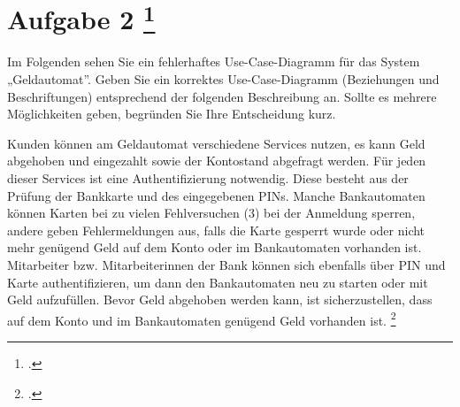 \documentclass{lehramt-informatik-aufgabe}
\begin{document}
\section{Aufgabe 2
\footcite[Thema 1 Teilaufgabe 1 Aufgabe 2]{examen:46116:2017:03}}

Im Folgenden sehen Sie ein fehlerhaftes Use-Case-Diagramm für das System
„Geldautomat”. Geben Sie ein korrektes Use-Case-Diagramm (Beziehungen
und Beschriftungen) entsprechend der folgenden Beschreibung an. Sollte
es mehrere Möglichkeiten geben, begründen Sie Ihre Entscheidung kurz.

Kunden können am Geldautomat verschiedene Services nutzen, es kann Geld
abgehoben und eingezahlt sowie der Kontostand abgefragt werden. Für
jeden dieser Services ist eine Authentifizierung notwendig. Diese
besteht aus der Prüfung der Bankkarte und des eingegebenen PINs. Manche
Bankautomaten können Karten bei zu vielen Fehlversuchen (3) bei der
Anmeldung sperren, andere geben Fehlermeldungen aus, falls die Karte
gesperrt wurde oder nicht mehr genügend Geld auf dem Konto oder im
Bankautomaten vorhanden ist. Mitarbeiter bzw. Mitarbeiterinnen der Bank
können sich ebenfalls über PIN und Karte authentifizieren, um dann den
Bankautomaten neu zu starten oder mit Geld aufzufüllen. Bevor Geld
abgehoben werden kann, ist sicherzustellen, dass auf dem Konto und im
Bankautomaten genügend Geld vorhanden ist.
\footcite[Aufgabe 3]{sosy:ab:3}
\end{document}
